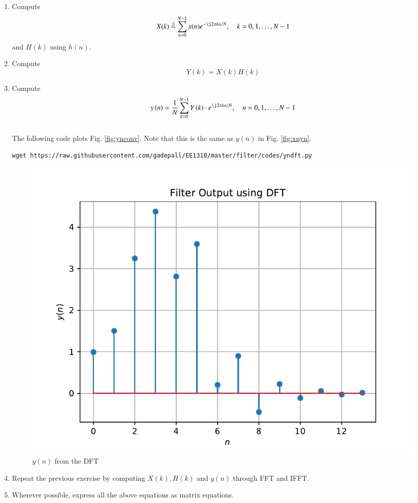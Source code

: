\documentclass[journal,12pt,twocolumn]{IEEEtran}
\renewcommand\thesection{\arabic{section}}
\begin{document}
	\begin{enumerate}[label=\thesection.\arabic*]
		\item
		Compute
		\begin{equation}
			X(k) \define \sum _{n=0}^{N-1}x(n) e^{-\j2\pi kn/N}, \quad k = 0,1,\dots, N-1
		\end{equation}
		and $H(k)$ using $h(n)$.
		\item Compute 
		\begin{equation}
			Y(k) = X(k)H(k)
		\end{equation}
		\item Compute
		\begin{equation}
			y\brak{n}={\frac {1}{N}}\sum _{k=0}^{N-1}Y\brak{k}\cdot e^{\j 2\pi kn/N},\quad n = 0,1,\dots, N-1
		\end{equation}
		\\
		\solution The following code plots Fig. \ref{fig:ynconv}. Note that this is the same as 
		$y(n)$ in  Fig. 
		\ref{fig:xnyn}. 
		\\[5pt]
		\begin{lstlisting}
wget https://raw.githubusercontent.com/gadepall/EE1310/master/filter/codes/yndft.py
		\end{lstlisting}
		\begin{figure}[!ht]
			\centering
			\includegraphics[width=\columnwidth]{./figs/yndft}
			\caption{$y(n)$ from the DFT}
			\label{fig:yndft}
		\end{figure}
		
		\item Repeat the previous exercise by computing $X(k), H(k)$ and $y(n)$ through FFT and 
		IFFT.
		\item Wherever possible, express all the above equations as matrix equations.
	\end{enumerate}
\end{document}
